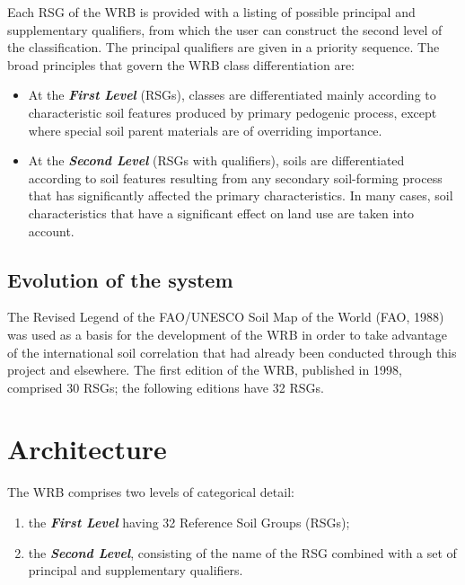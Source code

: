 \documentclass[
  letterpaper,
  DIV=11,
  numbers=noendperiod]{scrreprt}
\providecommand{\tightlist}{%
  \setlength{\itemsep}{0pt}\setlength{\parskip}{0pt}}\usepackage{longtable,booktabs,array}
\begin{document}
Each RSG of the WRB is provided with a listing of possible principal and
supplementary qualifiers, from which the user can construct the second
level of the classification. The principal qualifiers are given in a
priority sequence. The broad principles that govern the WRB class
differentiation are:

\begin{itemize}
\tightlist
\item
  At the \textbf{\emph{First Level}} (RSGs), classes are differentiated
  mainly according to characteristic soil features produced by primary
  pedogenic process, except where special soil parent materials are of
  overriding importance.
\item
  At the \textbf{\emph{Second Level}} (RSGs with qualifiers), soils are
  differentiated according to soil features resulting from any secondary
  soil-forming process that has significantly affected the primary
  characteristics. In many cases, soil characteristics that have a
  significant effect on land use are taken into account.
\end{itemize}

\hypertarget{evolution-of-the-system}{%
\subsection{Evolution of the system}\label{evolution-of-the-system}}

The Revised Legend of the FAO/UNESCO Soil Map of the World (FAO, 1988)
was used as a basis for the development of the WRB in order to take
advantage of the international soil correlation that had already been
conducted through this project and elsewhere. The first edition of the
WRB, published in 1998, comprised 30 RSGs; the following editions have
32 RSGs.

\hypertarget{architecture}{%
\section{Architecture}\label{architecture}}

The WRB comprises two levels of categorical detail:

\begin{enumerate}
\def\labelenumi{\arabic{enumi}.}
\tightlist
\item
  the \textbf{\emph{First Level}} having 32 Reference Soil Groups
  (RSGs);
\item
  the \textbf{\emph{Second Level}}, consisting of the name of the RSG
  combined with a set of principal and supplementary qualifiers.
\end{enumerate}
\end{document}
